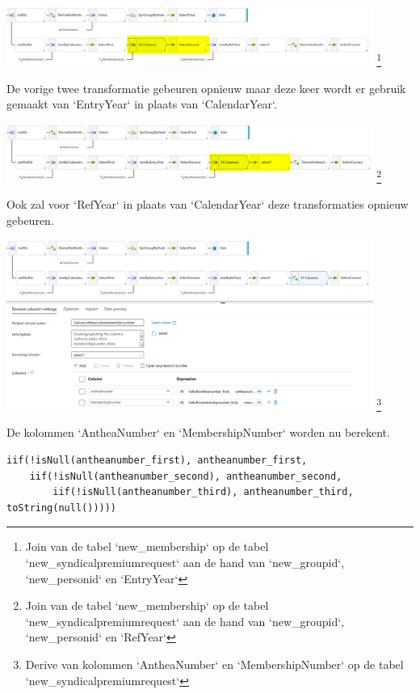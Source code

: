 \begin{center}
    \includegraphics[width=0.9\textwidth]{./graphics/adf/member_5.png}
    \footnote{Join van de tabel `new\_membership` op de tabel `new\_syndicalpremiumrequest` aan de hand van `new\_groupid`, `new\_personid` en `EntryYear`}
\end{center}

De vorige twee transformatie gebeuren opnieuw maar deze keer wordt er gebruik gemaakt van `EntryYear` in plaats van `CalendarYear`.

\begin{center}
    \includegraphics[width=0.9\textwidth]{./graphics/adf/member_6.png}
    \footnote{Join van de tabel `new\_membership` op de tabel `new\_syndicalpremiumrequest` aan de hand van `new\_groupid`, `new\_personid` en `RefYear`}
\end{center}

Ook zal voor `RefYear` in plaats van `CalendarYear` deze transformaties opnieuw gebeuren.

\begin{center}
    \includegraphics[width=0.9\textwidth]{./graphics/adf/member_7.png}
    \footnote{Derive van kolommen `AntheaNumber` en `MembershipNumber` op de tabel `new\_syndicalpremiumrequest`}
\end{center}

De kolommen `AntheaNumber` en `MembershipNumber` worden nu berekent.

\begin{verbatim}
iif(!isNull(antheanumber_first), antheanumber_first,      
    iif(!isNull(antheanumber_second), antheanumber_second,
        iif(!isNull(antheanumber_third), antheanumber_third, toString(null()))))
\end{verbatim}

